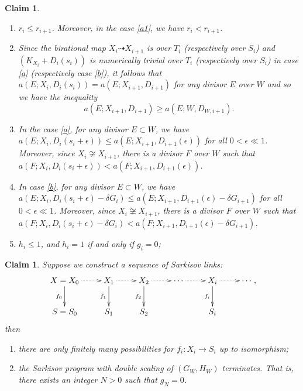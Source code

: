 \documentclass[11pt]{amsart}
\numberwithin{equation}{section}
\newtheorem{claim}[thm]{Claim}
\theoremstyle{definition}
\theoremstyle{definition}
\theoremstyle{definition}
\begin{document}
\begin{claim}\label{behavior}
  \begin{enumerate}
    \item $r_{i}\leqslant r_{i+1}$. Moreover, in the case \ref{a1}, we have $r_{i}<r_{i+1}$.
    \item Since the birational map $X_{i}\dashrightarrow X_{i+1}$ is over $T_{i}$ (respectively over $S_{i}$) and $(K_{X_{i}}+D_{i}(s_{i}))$ is numerically trivial over $T_{i}$ (respectively over $S_{i}$) in case \ref{a} (respectively case \ref{b}), it follows that $a(E;X_{i},D_{i}(s_{i}))= a(E;X_{i+1},D_{i+1})$ for any divisor $E$ over $W$ and so we have the inequality
          \[
            a(E;X_{i+1},D_{i+1})\geqslant a(E;W,D_{W,i+1}).
          \]
    \item\label{2adicrepancy}  In the case \ref{a}, for any divisor $E \subset W$, we have $a(E;X_{i},D_{i}(s_{i}+\epsilon))\leqslant a(E;X_{i+1},D_{i+1}(\epsilon))$ for all $0<\epsilon\ll 1$. Moreover, since $X_{i} \not\cong X_{i+1}$, there is a divisor $F$ over $W$ such that  $a(F;X_{i},D_{i}(s_{i}+\epsilon))< a(F;X_{i+1},D_{i+1}(\epsilon))$.

    \item\label{2bdiscrepancy}   In case \ref{b}, for any divisor $E \subset W$, we have $a(E;X_{i},D_{i}(s_{i}+\epsilon)-\delta G_{i})\leqslant a(E;X_{i+1},D_{i+1}(\epsilon)-\delta G_{i+1})$ for all $0<\epsilon\ll 1$. Moreover, since $X_{i} \not\cong X_{i+1}$, there is a divisor $F$ over $W$ such that  $a(F;X_{i},D_{i}(s_{i}+\epsilon)-\delta G_{i})< a(F;X_{i+1},D_{i+1}(\epsilon)-\delta G_{i+1})$.
    \item  $h_{i}\leqslant 1$, and $h_{i}=1$ if and only if $g_{i}=0$;
  \end{enumerate}
\end{claim}
\begin{claim}\label{termination2}
   Suppose we construct a sequence of Sarkisov links:
  \[
    \xymatrix{
    X=X_0\ar@{.>}[r]\ar[d]_{f_0}&X_{1}\ar@{.>}[r]\ar[d]_{f_1}& X_{2}\ar[d]_{f_2}\ar@{.>}[r] &\cdots\ar@{.>}[r]&X_{i}\ar[d]_{f_i}\ar@{.>}[r] &\cdots\\
    S=S_{0}&S_{1} &S_{2}&&S_{i}
    }
    ,\]
  then
  \begin{enumerate}
    \item there are only finitely many possibilities for $f_{i}:X_{i}\to S_{i}$ up to isomorphism;
    \item the Sarkisov program with double scaling of $(G_{W},H_{W})$ terminates. That is, there exists an integer $N>0$ such that $g_{N}=0$.
  \end{enumerate}
\end{claim}
\end{document}
